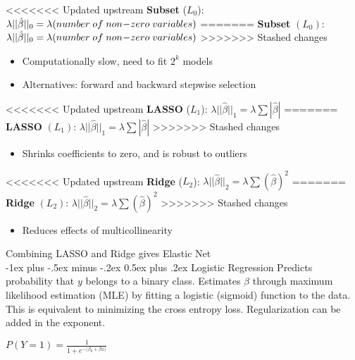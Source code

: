 \documentclass[10pt,landscape]{article}
\makeatletter
\renewcommand{\section}{\@startsection{section}{1}{0mm}%
                                {-1ex plus -.5ex minus -.2ex}%
                                {0.5ex plus .2ex}%
                                {\normalfont\large\bfseries}}
\makeatother
\begin{document}
\begin{multicols}{3}
<<<<<<< Updated upstream
\textbf{Subset}  ($L_0$): $\lambda ||\hat{\beta}||_0 = \lambda (number \;of\;non\hspace{-.7mm}-\hspace{-.7mm}zero\; variables)$ 
=======
\textbf{Subset}  $(L_0)$: $\lambda ||\hat{\beta}||_0 = \lambda (number \;of\;non\hspace{-.7mm}-\hspace{-.7mm}zero\; variables)$
>>>>>>> Stashed changes
\begin{itemize}[label={--},leftmargin=4mm]
\vspace{-1mm}
\itemsep -.4mm
\item Computationally slow, need to fit $2^k$ models
\item Alternatives: forward and backward stepwise selection
\end{itemize}
<<<<<<< Updated upstream
\textbf{LASSO}  ($L_1$): $\lambda ||\hat{\beta}||_1 = \lambda\sum | \hat{\beta} |$
=======
\textbf{LASSO} $(L_1)$: $\lambda ||\hat{\beta}||_1 = \lambda\sum | \hat{\beta} |$
>>>>>>> Stashed changes
\begin{itemize}[label={--},leftmargin=4mm]
\vspace{-1mm}
\itemsep -.4mm
\item Shrinks coefficients to zero, and is robust to outliers
\end{itemize}
<<<<<<< Updated upstream
\textbf{Ridge}  ($L_2$): $\lambda ||\hat{\beta}||_2 = \lambda\sum( \hat{\beta})^2$ 
=======
\textbf{Ridge}  $(L_2)$: $\lambda ||\hat{\beta}||_2 = \lambda\sum( \hat{\beta})^2$
>>>>>>> Stashed changes
\begin{itemize}[label={--},leftmargin=4mm]
\vspace{-1mm}
\itemsep -.4mm
\item Reduces effects of multicollinearity
\end{itemize}
Combining LASSO and Ridge gives Elastic Net\\

\columnbreak
\section{Logistic Regression}
Predicts probability that $y$ belongs to a binary class. Estimates $\beta$ through maximum likelihood estimation (MLE) by fitting a logistic (sigmoid) function to the data. This is equivalent to minimizing the cross entropy loss. Regularization can be added in the exponent.
\vspace{-3mm}
\begin{center}
$\displaystyle P(Y=1) = \frac{1}{1 + e^{-({\beta_0} + {\beta x)}}}$


\end{center}
\end{multicols}
\end{document}
